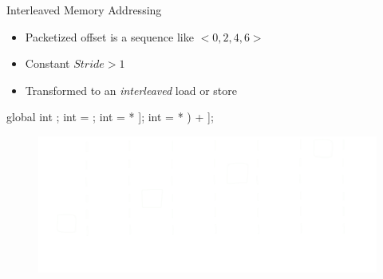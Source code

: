 \begin{frame}[fragile]{Interleaved Memory Addressing}

\begin{itemize}
    \item Packetized offset is a sequence like $<0, 2, 4, 6>$
    \item Constant $Stride > 1$
    \item Transformed to an \emph{interleaved} load or store
\end{itemize}

\begin{minipage}[t]{0.40\linewidth}
    \vspace{0.1ex}
    \begin{codebox}[commandchars=\\\[\]]
    
global int \uniform[*src];
int \varying[tid] = ;
int \varying[even] = \uniform[src]\idx[\varying[tid] * \uniform[2]];
int \varying[odd] = \uniform[src]\idx[(\varying[tid] * \uniform[2]) + \uniform[1]];




    \end{codebox}
\end{minipage}
\hspace{2em}
\begin{minipage}[t]{0.49\linewidth}
    \vspace{0.6ex}
    \begin{figure}
        \includegraphics[width=1.0\textwidth]{images/interleaved-access.pdf}
    \end{figure}
\end{minipage}

\end{frame}


